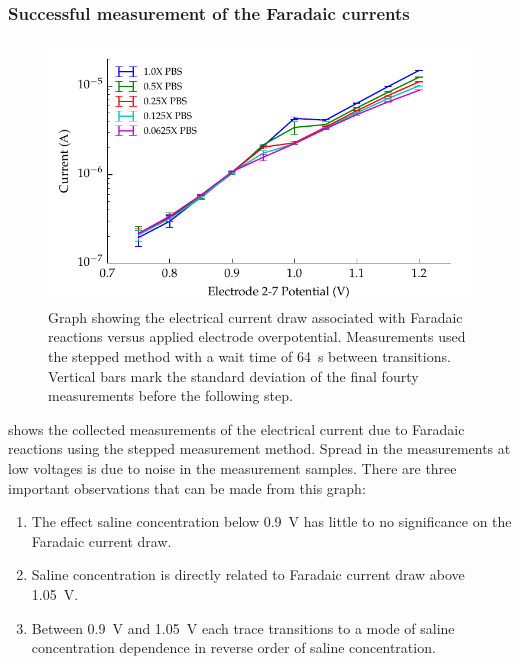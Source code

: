         \subsubsection{Successful measurement of the Faradaic currents}
        \begin{figure}
          \centering
          \includegraphics{content/pt2/08-InterfaceParameters/graphics/graph_currentVoltage_logY_Thesis}
          \caption{\label{fig:graph_currentVoltage_logY_Thesis}Graph showing the electrical current draw associated with Faradaic reactions versus applied electrode overpotential. Measurements used the stepped method with a wait time of \SI{64}{\second} between transitions. Vertical bars mark the standard deviation of the final fourty measurements before the following step.}
        \end{figure}
         shows the collected measurements of the electrical current due to Faradaic reactions using the stepped measurement method.
        Spread in the measurements at low voltages is due to noise in the measurement samples.
        There are three important observations that can be made from this graph:
        \begin{enumerate}
          \item The effect saline concentration below \SI{0.9}{\volt} has little to no significance on the Faradaic current draw.
          \item Saline concentration is directly related to Faradaic current draw above \SI{1.05}{\volt}.
          \item Between \SI{0.9}{\volt} and \SI{1.05}{\volt} each trace transitions to a mode of saline concentration dependence in reverse order of saline concentration.
        \end{enumerate}

